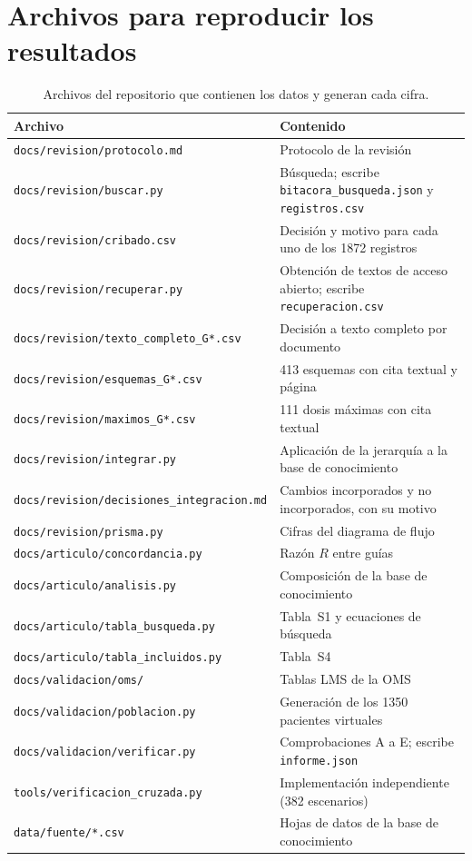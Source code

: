 \documentclass[10pt,a4paper]{article}
\newcommand{\archivo}[1]{\texttt{\small #1}}
\begin{document}
\section{Archivos para reproducir los resultados}

\begin{table}[htbp]
\centering
\caption{Archivos del repositorio que contienen los datos y generan cada cifra.}
\small
\begin{tabularx}{\textwidth}{@{}lX@{}}
\toprule
Archivo & Contenido \\
\midrule
\archivo{docs/revision/protocolo.md} & Protocolo de la revisión \\
\archivo{docs/revision/buscar.py} & Búsqueda; escribe \archivo{bitacora\_busqueda.json} y \archivo{registros.csv} \\
\archivo{docs/revision/cribado.csv} & Decisión y motivo para cada uno de los \num{1872} registros \\
\archivo{docs/revision/recuperar.py} & Obtención de textos de acceso abierto; escribe \archivo{recuperacion.csv} \\
\archivo{docs/revision/texto\_completo\_G*.csv} & Decisión a texto completo por documento \\
\archivo{docs/revision/esquemas\_G*.csv} & 413 esquemas con cita textual y página \\
\archivo{docs/revision/maximos\_G*.csv} & 111 dosis máximas con cita textual \\
\archivo{docs/revision/integrar.py} & Aplicación de la jerarquía a la base de conocimiento \\
\archivo{docs/revision/decisiones\_integracion.md} & Cambios incorporados y no incorporados, con su motivo \\
\archivo{docs/revision/prisma.py} & Cifras del diagrama de flujo \\
\archivo{docs/articulo/concordancia.py} & Razón $R$ entre guías \\
\archivo{docs/articulo/analisis.py} & Composición de la base de conocimiento \\
\archivo{docs/articulo/tabla\_busqueda.py} & Tabla~S1 y ecuaciones de búsqueda \\
\archivo{docs/articulo/tabla\_incluidos.py} & Tabla~S4 \\
\archivo{docs/validacion/oms/} & Tablas LMS de la OMS \\
\archivo{docs/validacion/poblacion.py} & Generación de los \num{1350} pacientes virtuales \\
\archivo{docs/validacion/verificar.py} & Comprobaciones A a E; escribe \archivo{informe.json} \\
\archivo{tools/verificacion\_cruzada.py} & Implementación independiente (382 escenarios) \\
\archivo{data/fuente/*.csv} & Hojas de datos de la base de conocimiento \\
\bottomrule
\end{tabularx}
\end{table}



\end{document}
